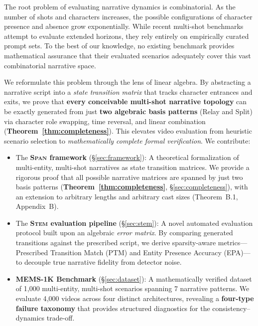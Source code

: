 \documentclass[sigconf,review,anonymous]{acmart}
\theoremstyle{definition}
\newcommand{\diagonal}{\textsc{Span}}
\newcommand{\stem}{\textsc{Stem}}
\begin{document}
The root problem of evaluating narrative dynamics is combinatorial. As the number of shots and characters increases, the possible configurations of character presence and absence grow exponentially. While recent multi-shot benchmarks~\cite{moviebench,locot2v,shotadapter} attempt to evaluate extended horizons, they rely entirely on empirically curated prompt sets. To the best of our knowledge, no existing benchmark provides mathematical assurance that their evaluated scenarios adequately cover this vast combinatorial narrative space. 

We reformulate this problem through the lens of linear algebra. By abstracting a narrative script into a \emph{state transition matrix} that tracks character entrances and exits, we prove that \textbf{every conceivable multi-shot narrative topology} can be exactly generated from just \textbf{two algebraic basis patterns} (Relay and Split) via character role swapping, time reversal, and linear combination (\textbf{Theorem~\ref{thm:completeness}}). This elevates video evaluation from heuristic scenario selection to \emph{mathematically complete formal verification}. We contribute:
\begin{itemize}[leftmargin=*,nosep]
  \item The \textbf{\diagonal{} framework} (\S\ref{sec:framework}): A theoretical formalization of multi-entity, multi-shot narratives as state transition matrices. We provide a rigorous proof that all possible narrative matrices are spanned by just two basis patterns (\textbf{Theorem~\ref{thm:completeness}}, \S\ref{sec:completeness}), with an extension to arbitrary lengths and arbitrary cast sizes (Theorem~B.1, Appendix~B).
  \item The \textbf{\stem{} evaluation pipeline} (\S\ref{sec:stem}): A novel automated evaluation protocol built upon an algebraic \emph{error matrix}. By comparing generated transitions against the prescribed script, we derive sparsity-aware metrics---Prescribed Transition Match (PTM) and Entity Presence Accuracy (EPA)---to decouple true narrative fidelity from detector noise.
  \item \textbf{MEMS-1K Benchmark} (\S\ref{sec:dataset}): A mathematically verified dataset of 1{,}000 multi-entity, multi-shot scenarios spanning 7 narrative patterns. We evaluate 4{,}000 videos across four distinct architectures, revealing a \textbf{four-type failure taxonomy} that provides structured diagnostics for the consistency--dynamics trade-off.
\end{itemize}
\end{document}
